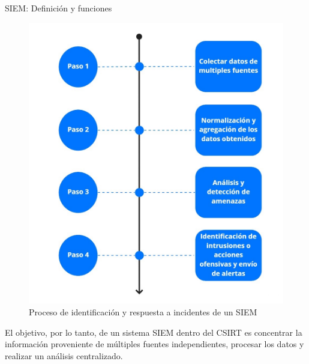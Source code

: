 \begin{section}{SIEM: Definición y funciones}
\begin{figure}[H]
            \includegraphics[width=1\textwidth]{./marco_teorico_imagenes/figura_9_procesos_de_un_siem.jpg}
            \caption{Proceso de identificación y respuesta a incidentes de un SIEM}
            \label{fig:procesos_siem}
        \end{figure}
        \FloatBarrier    
        El objetivo, por lo tanto, de un sistema SIEM dentro del CSIRT es concentrar la información proveniente de múltiples fuentes independientes, procesar los datos y realizar un análisis centralizado.
    \end{section}
